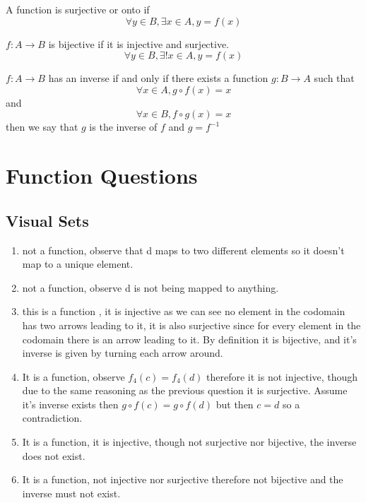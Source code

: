 \documentclass[11pt]{book}
\begin{document}
\begin{defn}[Onto]\label{defn:onto}
    A function is surjective or onto if
    \[
    \forall y \in B, \exists x \in A, y= f\left(x\right) 
    \]
\end{defn}

\begin{defn}[Bijective]\label{defn:bijective}
    $f : A \to B $ is bijective if it is injective and surjective.
    \[
    \forall y \in B, \exists! x \in A, y= f\left(x\right) 
    \]
\end{defn}

\newpage

\begin{defn}[Inverse]\label{defn:inverse}
    $f : A \to B $ has an inverse if and only if there exists a function $g : B \to A $ such that 
    \[
        \forall x \in A, g \circ f\left( x \right) = x 
    \]
    and
    \[
    \forall x \in B, f \circ g \left(x\right) = x
    \]
    then we say that $g $ is the inverse of $f$ and $g = f^{-1} $ 
\end{defn}


\section{Function Questions}%
\label{sec:function_questions}

\subsection{Visual Sets}%
\label{sub:visual_sets}

\begin{enumerate}
    \item not a function, observe that d maps to two different elements so it doesn't map to a unique element. 
    \item not a function, observe d is not being mapped to anything.
    \item this is a function , it is injective as we can see no element in the codomain has two arrows leading to it, it is also surjective since for every element in the codomain there is an arrow leading to it. By definition it is bijective, and it's inverse is given by turning each arrow around.
    \item It is a function, observe $f_{4} \left(c\right) = f_{4} \left(d\right) $ therefore it is not injective, though due to the same reasoning as the previous question it is surjective. Assume it's inverse exists then $g \circ f \left(c\right) = g \circ f \left(d\right) $   but then $c = d$ so a contradiction. 
    \item It is a function, it is injective, though not surjective nor bijective, the inverse does not exist.
    \item It is a function, not injective nor surjective therefore not bijective and the inverse must not exist.
\end{enumerate}
\end{document}
